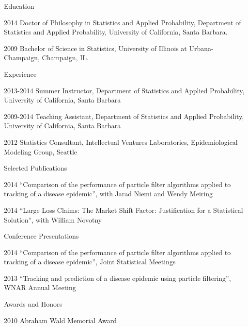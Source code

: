   \begin{vitae}

    {\small
      \begin{vitaesection}{Education}
        \vspace{-0.1cm}
      \item [2014] Doctor of Philosophy in Statistics and Applied Probability, Department of
           Statistics and Applied Probability, University of California, Santa Barbara.
      \item [2009] Bachelor of Science in Statistics, University of Illinois at Urbana-Champaign, Champaign, IL.
      \end{vitaesection}

      \begin{vitaesection}{Experience}
        \vspace{-0.1cm}
      \item [2013-2014] Summer Instructor, Department of Statistics and Applied Probability, University of California, Santa Barbara
      \item [2009-2014] Teaching Assistant, Department of Statistics and Applied Probability, University of California, Santa Barbara
      \item [2012] Statistics Consultant, Intellectual Ventures Laboratories, Epidemiological Modeling Group, Seattle
      \end{vitaesection}

      \begin{vitaesection}{Selected Publications}
        \vspace{-0.1cm}
      \item [2014] ``Comparison of the performance of particle filter algorithms applied to tracking of a disease epidemic'', with Jarad Niemi and Wendy Meiring
      \item [2014] ``Large Loss Claims: The Market Shift Factor: Justification for a Statistical Solution'', with William Novotny
        \vspace{0.3cm}
      \end{vitaesection}

      \begin{vitaesection}{Conference Presentations}
        \vspace{-0.1cm}
      \item [2014] ``Comparison of the performance of particle filter algorithms applied to tracking of a disease epidemic'', Joint Statistical Meetings
      \item [2013] ``Tracking and prediction of a disease epidemic using particle filtering'', WNAR Annual Meeting
        \vspace{0.3cm}
      \end{vitaesection}

      \begin{vitaesection}{Awards and Honors}
      \item [2010] Abraham Wald Memorial Award
        \vspace{-0.1cm}
      \end{vitaesection}
    }
  \end{vitae}
\dsp

